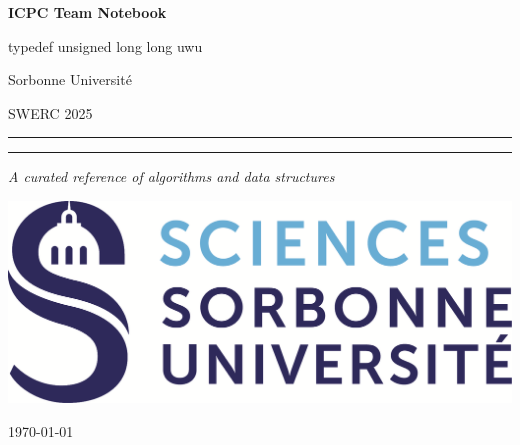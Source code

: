 \documentclass[10pt,a4paper]{article}
\begin{document}
\begin{titlepage}
  \centering

  \vspace*{2cm}
  {\Huge\bfseries ICPC Team Notebook\par}
  \vspace{1cm}

  {\Large {typedef unsigned long long uwu}\par}
  {\Large {Sorbonne Université}\par}
  {\Large SWERC 2025\par}
  \vspace{1.5cm}

  \rule{\linewidth}{1.5pt}\par
  \vspace{0.5cm}
  \rule{\linewidth}{0.5pt}\par
  \vspace{1.5cm}

  {\LARGE \itshape A curated reference of algorithms and data structures\par}
  \vspace{1cm}

  \includegraphics[width=0.2 \textwidth]{img/logo.png}\par
  \vspace{1cm}

  {\large \today\par}

  \clearpage
\end{titlepage}


\clearpage
\tableofcontents

\twocolumn

\end{document}
